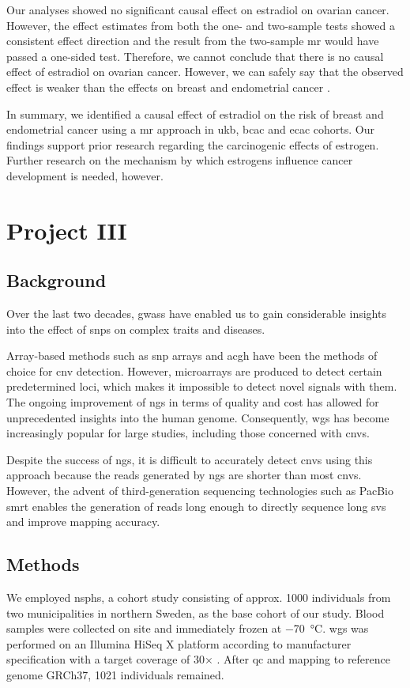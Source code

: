 \documentclass[draft]{scrbook}
\begin{document}
Our analyses showed no significant causal effect on estradiol on ovarian cancer.
However, the effect estimates from both the one- and two-sample tests showed a consistent effect direction and the result from the two-sample \gls{mr} would have passed a one-sided test.
Therefore, we cannot conclude that there is no causal effect of estradiol on ovarian cancer.
However, we can safely say that the observed effect is weaker than the effects on breast and endometrial cancer \cite{Trabert2016,Key2011,Rodriguez2019}.

In summary, we identified a causal effect of estradiol on the risk of breast and endometrial cancer using a \gls{mr} approach in \gls{ukb}, \gls{bcac} and \gls{ecac} cohorts.
Our findings support prior research regarding the carcinogenic effects of estrogen.
Further research on the mechanism by which estrogens influence cancer development is needed, however.

\chapter{Project III}
\section{Background}
Over the last two decades, \glspl{gwas} have enabled us to gain considerable insights into the effect of \glspl{snp} on complex traits and diseases.

Array-based methods such as \gls{snp} arrays and \gls{acgh} have been the methods of choice for \gls{cnv} detection.
However, microarrays are produced to detect certain predetermined loci, which makes it impossible to detect novel signals with them.
The ongoing improvement of \gls{ngs} in terms of quality and cost has allowed for unprecedented insights into the human genome.
Consequently, \gls{wgs} has become increasingly popular for large studies, including those concerned with \glspl{cnv}.

Despite the success of \gls{ngs}, it is difficult to accurately detect \glspl{cnv} using this approach because the reads generated by \gls{ngs} are shorter than most \glspl{cnv}.
However, the advent of third-generation sequencing technologies such as PacBio \gls{smrt} enables the generation of reads long enough to directly sequence long \glspl{sv} and improve mapping accuracy.

\section{Methods}
We employed \gls{nsphs}, a cohort study consisting of approx. 1000 individuals from two municipalities in northern Sweden, as the base cohort of our study.
Blood samples were collected on site and immediately frozen at \qty{-70}{\celsius}.
\Gls{wgs} was performed on an Illumina HiSeq X platform according to manufacturer specification with a target coverage of 30$\times$ \cite{Ameur2017}.
After \gls{qc} and mapping to reference genome GRCh37, 1021 individuals remained.
\end{document}
